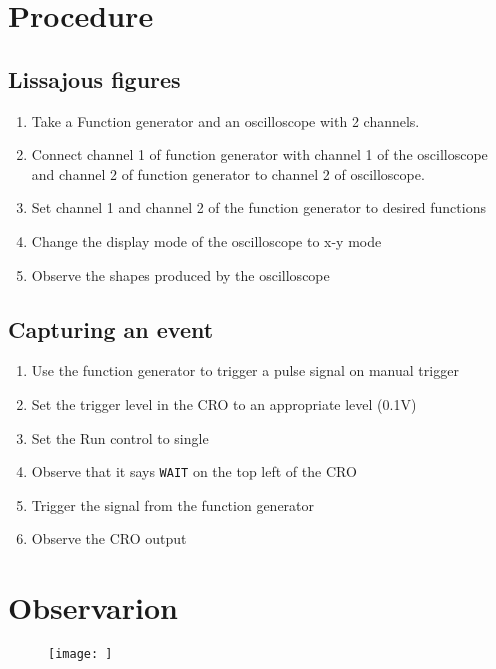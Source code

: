 \documentclass[journal]{IEEEtran}
\begin{document}


\section{Procedure}
\subsection{Lissajous figures}
\begin{enumerate}
    \item Take a Function generator and an oscilloscope with 2 channels.
    \item Connect channel 1 of function generator with channel 1 of the oscilloscope and channel 2 of function generator to channel 2 of oscilloscope.
    \item Set channel 1 and channel 2 of the function generator to desired functions
    \item Change the display mode of the oscilloscope to x-y mode
    \item Observe the shapes produced by the oscilloscope
\end{enumerate}

\subsection{Capturing an event}
\begin{enumerate}
    \item Use the function generator to trigger a pulse signal on manual trigger
    \item Set the trigger level in the CRO to an appropriate level (0.1V)
    \item Set the Run control to single
    \item Observe that it says \texttt{WAIT} on the top left of the CRO
    \item Trigger the signal from the function generator
    \item Observe the CRO output
\end{enumerate}

\section{Observarion}
\begin{figure}
    \centering
    \texttt{[image: ]}
\end{figure}
\end{document}
